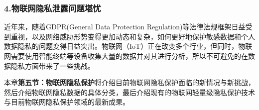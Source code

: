 \subsubsection{\textcolor{myblue}{\textbf{4.物联网隐私泄露问题堪忧}}}

近年来，随着GDPR(General Data Protection Regulation)等法律法规框架日益受到重视，以及网络威胁形势变得更加动态和复杂，如何更好地保护敏感数据和个人数据隐私的问题变得日益突出。物联网（IoT）正在改变多个行业，但同时，物联网需要使用智能终端等设备收集大量的数据并对其进行分析，所以不可避免的在数据隐私方面带来了一些挑战。

本章\textcolor{myblue}{\textbf{第五节：物联网隐私保护}}将介绍目前物联网隐私保护面临的新情况与新挑战，然后介绍物联网隐私数据的具体分类，最后介绍现有的物联网轻量级隐私保护技术与目前物联网隐私保护领域的最新成果。

